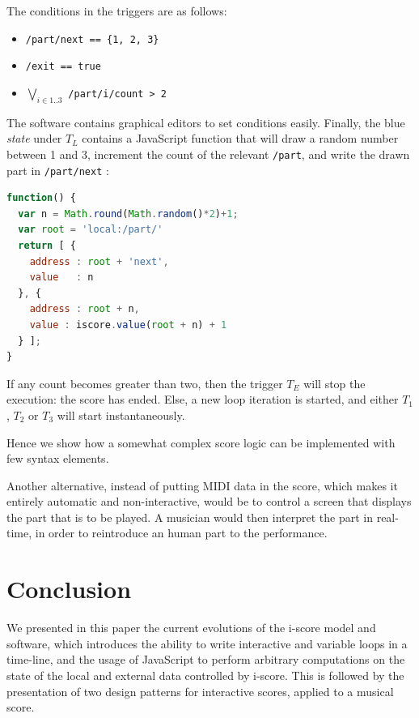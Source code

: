 \documentclass{article}
\newcommand{\state}{\textit{state}\xspace}
\begin{document}
The conditions in the triggers are as follows: 
{\scriptsize
\begin{itemize}
\item {} \lstinline|/part/next == {1, 2, 3}|
\item {} \lstinline{/exit == true}
\item {} $\displaystyle\bigvee_{i \in 1..3}$ \lstinline{/part/i/count > 2} 
\end{itemize}
}

The software contains graphical editors to set conditions easily.
Finally, the blue \state under $T_{L}$ contains a JavaScript function 
that will draw a random number between 1 and 3, 
increment the count of the relevant \verb|/part|, 
and write the drawn part in \verb|/part/next| : 

\begin{lstlisting}[language=JavaScript]
function() {      
  var n = Math.round(Math.random()*2)+1;	
  var root = 'local:/part/'
  return [ {
    address : root + 'next',
    value   : n 
  }, {
    address : root + n,
    value : iscore.value(root + n) + 1
  } ];
}
\end{lstlisting}

If any count becomes greater than two, then the
trigger $T_{E}$ will stop the execution: the score has ended. 
Else, a new loop iteration is started, and either 
$T_1$, $T_2$ or $T_3$ will start instantaneously.

Hence we show how a somewhat complex score logic 
can be implemented with few syntax elements.

Another alternative, instead of putting MIDI data in the score,
which makes it entirely automatic and non-interactive,  
would be to control a screen that displays the part that is 
to be played.
A musician would then interpret the part in real-time, in order 
to reintroduce an human part to the performance.
	
\section{Conclusion}
We presented in this paper the current evolutions of the i-score 
model and software, which introduces the ability to write interactive and variable loops in a time-line, 
and the usage of JavaScript to perform arbitrary computations on the state of the local and external data controlled by i-score.
This is followed by the presentation of two design patterns for interactive scores, applied to a musical score.
\end{document}
